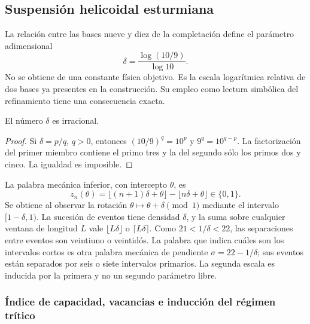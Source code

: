 \subsection{Suspensión helicoidal esturmiana}

La relación entre las bases nueve y diez de la completación define el parámetro adimensional
\begin{equation}
 \delta=\frac{\log(10/9)}{\log10}.
 \label{x_reciprocidad:eq:delta-sturm}
\end{equation}
No se obtiene de una constante física objetivo. Es la escala logarítmica relativa de dos bases ya presentes en la construcción. Su empleo como lectura simbólica del refinamiento tiene una consecuencia exacta.

\begin{lemma}
El número \(\delta\) es irracional.
\end{lemma}
\begin{proof}
Si \(\delta=p/q\), \(q>0\), entonces \((10/9)^q=10^p\) y \(9^q=10^{q-p}\). La factorización del primer miembro contiene el primo tres y la del segundo sólo los primos dos y cinco. La igualdad es imposible.
\end{proof}

La palabra mecánica inferior, con intercepto \(\theta\), es
\[
 z_n(\theta)=\lfloor(n+1)\delta+\theta\rfloor-\lfloor n\delta+\theta\rfloor\in\{0,1\}.
\]
Se obtiene al observar la rotación \(\theta\mapsto\theta+\delta\pmod1\) mediante el intervalo \([1-\delta,1)\). La sucesión de eventos tiene densidad \(\delta\), y la suma sobre cualquier ventana de longitud \(L\) vale \(\lfloor L\delta\rfloor\) o \(\lceil L\delta\rceil\). Como \(21<1/\delta<22\), las separaciones entre eventos son veintiuno o veintidós. La palabra que indica cuáles son los intervalos cortos es otra palabra mecánica de pendiente \(\sigma=22-1/\delta\); sus eventos están separados por seis o siete intervalos primarios. La segunda escala es inducida por la primera y no un segundo parámetro libre.


\subsubsection{Índice de capacidad, vacancias e inducción del régimen trítico}
\label{x_reciprocidad:vac-capacidad-trit}

